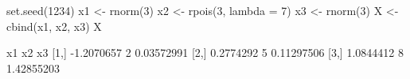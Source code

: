 \begin{Schunk}
\begin{Sinput}
  set.seed(1234)
  x1 <- rnorm(3)
  x2 <- rpois(3, lambda = 7)
  x3 <- rnorm(3)
  X <- cbind(x1, x2, x3)
  X
\end{Sinput}
\begin{Soutput}
             x1 x2         x3
[1,] -1.2070657  2 0.03572991
[2,]  0.2774292  5 0.11297506
[3,]  1.0844412  8 1.42855203
\end{Soutput}
\end{Schunk}
